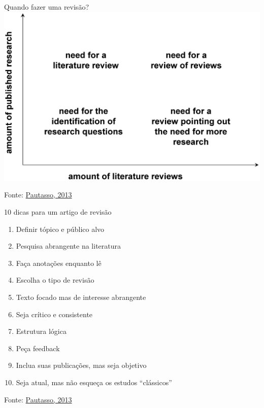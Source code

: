 \documentclass{beamer}
\begin{document}
\begin{frame}{Quando fazer uma revisão?}
  \includegraphics[height=0.8\textheight]{Revisao_resumo/10_dicas_revisao}

  \vfill
  \scriptsize
  \hfill Fonte: \href{https://doi.org/10.1371/journal.pcbi.1003149}{Pautasso, 2013}
\end{frame}

\begin{frame}{10 dicas para um artigo de revisão}
  \begin{enumerate}
    \scriptsize
  \item<1> Definir tópico e público alvo
    \smallskip
  \item<2> Pesquisa abrangente na literatura
    \smallskip
  \item<3> Faça anotações enquanto lê
    \smallskip
  \item<4> Escolha o tipo de revisão
    \smallskip
  \item<5> Texto focado mas de interesse abrangente
    \smallskip
  \item<6> Seja crítico e consistente
    \smallskip
  \item<7> Estrutura lógica
    \smallskip
  \item<8> Peça feedback
    \smallskip
  \item<9> Inclua suas publicações, mas seja objetivo
    \smallskip
  \item<10> Seja atual, mas não esqueça os estudos ``clássicos''
  \end{enumerate}

  \vfill
  \scriptsize
  \hfill Fonte: \href{https://doi.org/10.1371/journal.pcbi.1003149}{Pautasso, 2013}
\end{frame}
\end{document}
